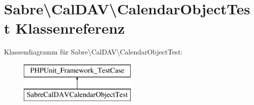 \hypertarget{class_sabre_1_1_cal_d_a_v_1_1_calendar_object_test}{}\section{Sabre\textbackslash{}Cal\+D\+AV\textbackslash{}Calendar\+Object\+Test Klassenreferenz}
\label{class_sabre_1_1_cal_d_a_v_1_1_calendar_object_test}
Klassendiagramm für Sabre\textbackslash{}Cal\+D\+AV\textbackslash{}Calendar\+Object\+Test\+:\begin{figure}[H]
\begin{center}
\leavevmode
\includegraphics[height=2.000000cm]{class_sabre_1_1_cal_d_a_v_1_1_calendar_object_test}
\end{center}
\end{figure}
